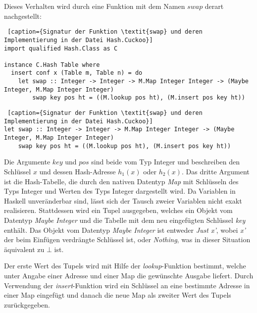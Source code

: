 Dieses Verhalten wird durch eine Funktion mit dem Namen \(swap\) derart nachgestellt:
\begin{lstlisting} [caption={Signatur der Funktion \textit{swap} und deren Implementierung in der Datei Hash.Cuckoo}]
import qualified Hash.Class as C

instance C.Hash Table where
  insert conf x (Table m, Table n) = do
    let swap :: Integer -> Integer -> M.Map Integer Integer -> (Maybe Integer, M.Map Integer Integer)
        swap key pos ht = ((M.lookup pos ht), (M.insert pos key ht))
\end{lstlisting}
\newpage
\begin{lstlisting} [caption={Signatur der Funktion \textit{swap} und deren Implementierung in der Datei Hash.Cuckoo}]
let swap :: Integer -> Integer -> M.Map Integer Integer -> (Maybe Integer, M.Map Integer Integer)
    swap key pos ht = ((M.lookup pos ht), (M.insert pos key ht))
\end{lstlisting}
Die Argumente \(key\) und \(pos\) sind beide vom Typ Integer und beschreiben den Schlüssel \(x\) und dessen Hash-Adresse \(h_{1}(x)\) oder \(h_{2}(x)\). Das dritte Argument ist die Hash-Tabelle, die durch den nativen Datentyp \textit{Map} mit Schlüsseln des Typs Integer und Werten des Typs Integer dargestellt wird. Da Variablen in Haskell unveränderbar sind, lässt sich der Tausch zweier Variablen nicht exakt realisieren. Stattdessen wird ein Tupel ausgegeben, welches ein Objekt vom Datentyp \textit{Maybe Integer} und die Tabelle mit dem neu eingefügten Schlüssel \textit{key} enthält. Das Objekt vom Datentyp \textit{Maybe Integer} ist entweder \textit{Just x'}, wobei \textit{x'} der beim Einfügen verdrängte Schlüssel ist, oder \textit{Nothing}, was in dieser Situation äquivalent zu \(\bot\) ist. 

Der erste Wert des Tupels wird mit Hilfe der \textit{lookup}-Funktion bestimmt, welche unter Angabe einer Adresse und einer Map die gewünschte Ausgabe liefert. Durch Verwendung der \textit{insert}-Funktion wird ein Schlüssel an eine bestimmte Adresse in einer Map eingefügt und danach die neue Map als zweiter Wert des Tupels zurückgegeben. 

